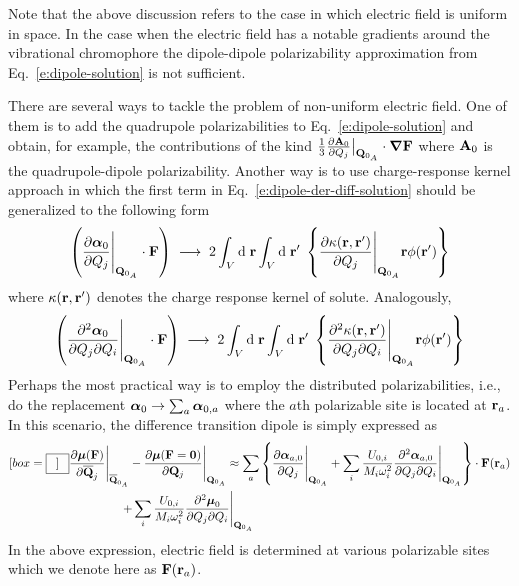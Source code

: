 \documentclass[a4paper,titlepage,twoside,fleqn,12pt]{book}
\newcommand*{\widebox}[2][0.5em]{\fbox{\hspace{#1}$\displaystyle #2$\hspace{#1}}}
\newcommand{\BM}[1]{\ensuremath{\mbox{\boldmath${#1}$}}}
\begin{document}
\begin{refsection}
Note that the above discussion refers to the case
in which electric field is uniform in space. 
In the case when the electric field has a notable
gradients around the vibrational chromophore
the dipole\hyp{}dipole polarizability approximation from Eq.~\eqref{e:dipole-solution} 
is not sufficient. 

There are several ways to tackle the problem of non\hyp{}uniform
electric field.
One of them is to
add the quadrupole polarizabilities to Eq.~\eqref{e:dipole-solution} 
and obtain, for example, the contributions
of the kind $\frac{1}{3} \frac{\partial{\bf A}_0}{\partial Q_j} \big|_{{\bf Q}_{0_A}} \cdot {\BM \nabla}{\bf F}$ 
where ${\bf A}_0$ is the quadrupole-dipole polarizability. Another way is to use
charge\hyp{}response kernel approach in which
the first term in Eq.~\eqref{e:dipole-der-diff-solution} should be generalized 
to the following form\citep{Cho.JCP.2009}
%
\begin{equation} \label{e:trans-dip-cho-pot-ind-effect}
\left( \frac{\partial{\BM \alpha}_0}{\partial Q_j} \Bigg|_{{\bf Q}_{0_A}} \cdot {\bf F} \right)
\;\longrightarrow\;
2\int_V {\rm d}\;{\bf r} \int_V    {\rm d}\;{\bf r}' \; 
\left\{
\frac{\partial \kappa({\bf r},{\bf r}')}{\partial Q_j} \Bigg|_{{\bf Q}_{0_A}} {\bf r} \phi({\bf r}')
\right\}
%
\end{equation}
%
where $\kappa({\bf r},{\bf r}')$ denotes the charge response kernel
of solute. Analogously,
%
\begin{equation} \label{e:trans-dip-cho-pot-ind-effect-quadratic}
\left( \frac{\partial^2{\BM \alpha}_0}{\partial Q_j \partial Q_i} \Bigg|_{{\bf Q}_{0_A}} \cdot {\bf F} \right)
\;\longrightarrow\;
2\int_V {\rm d}\;{\bf r} \int_V    {\rm d}\;{\bf r}' \; 
\left\{
\frac{\partial^2 \kappa({\bf r},{\bf r}')}{\partial Q_j \partial Q_i} \Bigg|_{{\bf Q}_{0_A}} {\bf r} \phi({\bf r}')
\right\}
%
\end{equation}
%
Perhaps the most practical way is to employ the distributed
polarizabilities, i.e., do the replacement ${\BM \alpha}_0\rightarrow\sum_a{\BM \alpha}_{0,a}$
where the $a$th polarizable site is located at ${\bf r}_a$. 
In this scenario, the difference transition dipole 
is simply expressed as
%
\begin{multline}[box=\widebox] \label{e:dipole-der-diff-solution-distributed}
\frac{\partial{\BM \mu}({\bf F})}{\partial\overline {\bf Q}_j} \Bigg|_{\overline{\bf Q}_{0_A}} -  
 \frac{\partial{\BM \mu}({\bf F}={\bf 0})}{\partial {\bf Q}_j} \Bigg|_{{\bf Q}_{0_A}} \approx
%
\sum_a \left\{
\frac{\partial{\BM \alpha}_{a,0}}{\partial Q_j} \Bigg|_{{\bf Q}_{0_A}} 
+
\sum_i \frac{U_{0,i}}{M_i\omega_i^2} 
%
\frac{\partial^2{\BM \alpha}_{a,0}}{\partial Q_j \partial Q_i} \Bigg|_{{\bf Q}_{0_A}} 
\right\} \cdot {\bf F}({\bf r}_a) \\
+
\sum_i \frac{U_{0,i}}{M_i\omega_i^2}
\frac{\partial^2{\BM \mu}_0}{\partial Q_j \partial Q_i} \Bigg|_{{\bf Q}_{0_A}}
%
\qquad\qquad\qquad\qquad\qquad\qquad
\end{multline}
%
In the above expression, electric field is determined at
various polarizable sites which we denote here as ${\bf F}({\bf r}_a)$.


\end{refsection}
\end{document}
